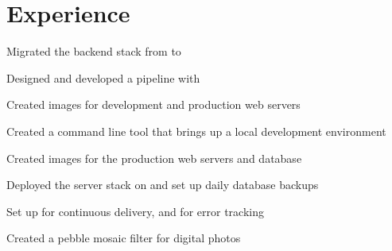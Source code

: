 \documentclass[]{deedy-resume-openfont}
\begin{document}
\hfill
\begin{minipage}[t]{0.66\textwidth}


\section{Experience}

\begin{tightemize}

\item Migrated the backend stack from to 

\item Designed and developed a  pipeline with 

\item Created images for development and production web servers

\item Created a command line tool that brings up a local development environment

\end{tightemize}
\sectionsep
{}
\begin{tightemize}

\item Created images for the production web servers and database

\item Deployed the server stack on and set up daily database backups

\item Set up for continuous delivery, and for error tracking

\end{tightemize}
\sectionsep
{}
\begin{tightemize}

\item Created a pebble mosaic filter for digital photos


\end{tightemize}
\end{minipage}
\end{document}
